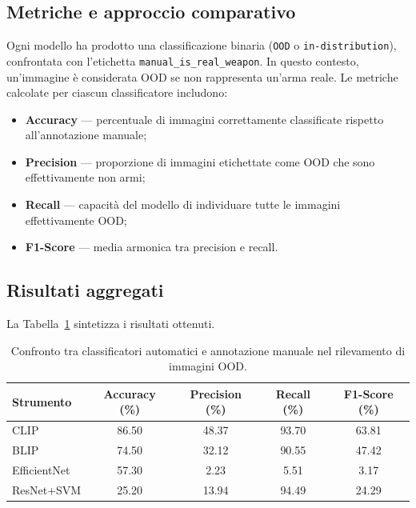 \subsection{Metriche e approccio comparativo}

Ogni modello ha prodotto una classificazione binaria (\texttt{OOD} o \texttt{in-distribution}), confrontata con l’etichetta \texttt{manual\_is\_real\_weapon}. In questo contesto, un’immagine è considerata OOD se non rappresenta un’arma reale. Le metriche calcolate per ciascun classificatore includono:

\begin{itemize}
  \item \textbf{Accuracy} — percentuale di immagini correttamente classificate rispetto all’annotazione manuale;
  \item \textbf{Precision} — proporzione di immagini etichettate come OOD che sono effettivamente non armi;
  \item \textbf{Recall} — capacità del modello di individuare tutte le immagini effettivamente OOD;
  \item \textbf{F1-Score} — media armonica tra precision e recall.
\end{itemize}

\subsection{Risultati aggregati}

La Tabella~\ref{tab:ood-global-comparison} sintetizza i risultati ottenuti.

\begin{table}[H]
\centering
\begin{tabular}{lcccc}
\toprule
\textbf{Strumento} & \textbf{Accuracy (\%)} & \textbf{Precision (\%)} & \textbf{Recall (\%)} & \textbf{F1-Score (\%)} \\
\midrule
CLIP           & 86.50 & 48.37 & 93.70 & 63.81 \\
BLIP           & 74.50 & 32.12 & 90.55 & 47.42 \\
EfficientNet   & 57.30 &  2.23 &  5.51 &  3.17 \\
ResNet+SVM     & 25.20 & 13.94 & 94.49 & 24.29 \\
\bottomrule
\end{tabular}
\caption{Confronto tra classificatori automatici e annotazione manuale nel rilevamento di immagini OOD.}
\label{tab:ood-global-comparison}
\end{table}

